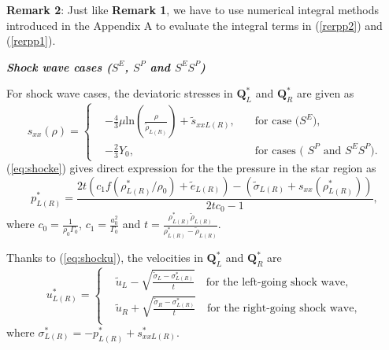 \documentclass[review]{elsarticle}
\numberwithin{equation}{section}
\numberwithin{table}{section}
\begin{document}
\textbf{Remark 2}:  Just like \textbf{Remark 1}, we have to use numerical integral methods introduced in the Appendix A to evaluate the integral terms in (\ref{rerpp2}) and (\ref{rerpp1}). %



\emph{\textbf{Shock wave cases ($S^E$, $S^P$ and $S^ES^P$)}}

For shock wave cases, the deviatoric stresses in $\mathbf{Q}_{L}^*$  and  $\mathbf{Q}_{R}^*$ are given as
\begin{equation*}
s_{xx}(\rho) = \left\{\begin{aligned}
	  & -\frac{4}{3}\mu\text{ln}\left(\frac{\rho}{\tilde{\rho}_{L(R)}}\right)+\tilde{s}_{xxL(R)},
	\quad  &\text{for case ($S^E$)},\\
	& -\frac{2}{3}Y_0,   \quad
	&\text{for cases ( $S^P$ and $S^ES^P$)}.
  \end{aligned} \right.
  \end{equation*}
(\ref{eq:shocke}) gives direct expression for the
the pressure in the star region as
\begin{equation*}
  p_{L(R)}^*=
  \frac{2t\left(c_1f(\rho_{L(R)}^*/\rho_0)+\tilde{e}_{L(R)}\right)-\left(\tilde{\sigma}_{L(R)}+{s}_{xx}(\rho_{L(R)}^*)\right)}{2tc_0-1},
\end{equation*}
where $c_0 = \frac{1}{\rho_0\Gamma_0}$, $c_1 = \frac{a_0^2}{\Gamma_0}$ and $ t=\frac{\rho^*_{L(R)} \tilde{\rho}_{L(R)}}{\rho^*_{L(R)}- \tilde{\rho}_{L(R)}}$.

Thanks to (\ref{eq:shocku}), the velocities in $\mathbf{Q}_{L}^*$  and  $\mathbf{Q}_{R}^*$ are
\begin{equation*}
  u_{L(R)}^*= \left\{ \begin{aligned}
	&	\tilde{u}_L -\sqrt{\frac{\tilde{\sigma}_L-\sigma_{L(R)}^*}{t}} \quad \text{for the left-going shock wave},\\
	&  \tilde{u}_R +\sqrt{\frac{\tilde{\sigma}_R-\sigma_{L(R)}^*}{t}} \quad \text{for the right-going shock wave},\\
  \end{aligned}
\right.
\end{equation*}
where $\sigma_{L(R)}^* = -p_{L(R)}^*+s_{xxL(R)}^*$.
\end{document}
